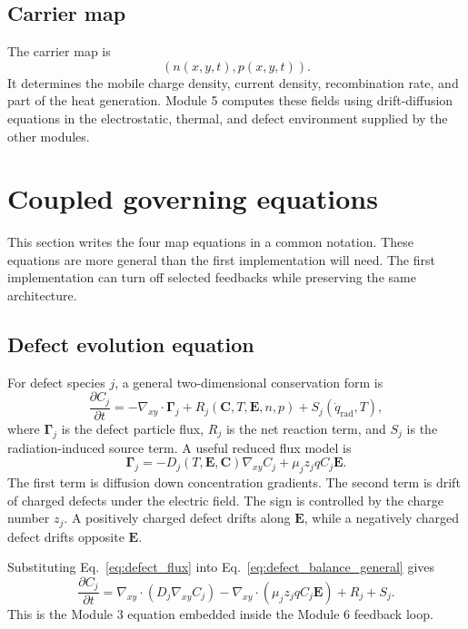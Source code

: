 \documentclass[11pt]{article}
\newcommand{\Evec}{\bm{E}}
\newcommand{\Cvec}{\bm{C}}
\newcommand{\Gammavec}{\bm{\Gamma}}
\newcommand{\gradxy}{\nabla_{xy}}
\newcommand{\divxy}{\nabla_{xy}\cdot}
\begin{document}
\subsection{Carrier map}

The carrier map is
\begin{equation}
(n(x,y,t),p(x,y,t)).
\end{equation}
It determines the mobile charge density, current density, recombination rate, and part of the heat generation. Module 5 computes these fields using drift-diffusion equations in the electrostatic, thermal, and defect environment supplied by the other modules.

\section{Coupled governing equations}

This section writes the four map equations in a common notation. These equations are more general than the first implementation will need. The first implementation can turn off selected feedbacks while preserving the same architecture.

\subsection{Defect evolution equation}

For defect species \(j\), a general two-dimensional conservation form is
\begin{equation}
\frac{\partial C_j}{\partial t}
=
-\divxy \Gammavec_j + R_j(\Cvec,T,\Evec,n,p)+S_j(\dot{q}_{\mathrm{rad}},T),
\label{eq:defect_balance_general}
\end{equation}
where \(\Gammavec_j\) is the defect particle flux, \(R_j\) is the net reaction term, and \(S_j\) is the radiation-induced source term. A useful reduced flux model is
\begin{equation}
\Gammavec_j
=
-D_j(T,\Evec,\Cvec)\gradxy C_j
+
\mu_j z_j q C_j \Evec.
\label{eq:defect_flux}
\end{equation}
The first term is diffusion down concentration gradients. The second term is drift of charged defects under the electric field. The sign is controlled by the charge number \(z_j\). A positively charged defect drifts along \(\Evec\), while a negatively charged defect drifts opposite \(\Evec\).

Substituting Eq.~\eqref{eq:defect_flux} into Eq.~\eqref{eq:defect_balance_general} gives
\begin{equation}
\boxed{
\frac{\partial C_j}{\partial t}
=
\divxy\left(D_j\gradxy C_j\right)
-
\divxy\left(\mu_j z_j q C_j\Evec\right)
+
R_j+S_j.}
\label{eq:defect_pde}
\end{equation}
This is the Module 3 equation embedded inside the Module 6 feedback loop.
\end{document}
